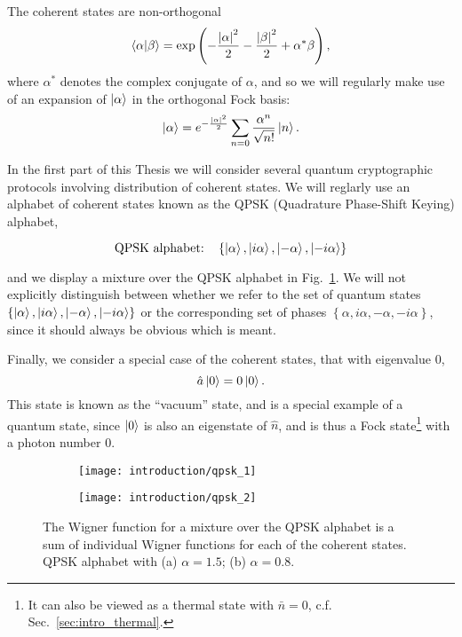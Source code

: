 \noindent The coherent states are non-orthogonal
\begin{equation}
\ip{\alpha}{\beta} = \exp\left(- \frac{\left|\alpha\right|^2}{2} - \frac{\left|\beta\right|^2}{2} + \alpha^* \beta \right),
\end{equation}
where $\alpha^*$ denotes the complex conjugate of $\alpha$, and so we will regularly make use of an expansion of $\ket{\alpha}$ in the orthogonal Fock basis:
\begin{equation}\label{eqn:intro_coherent_fock}
\ket{\alpha} = e^{-\frac{\left|\alpha\right|^2}{2}} \sum_{n=0} \frac{\alpha^n}{\sqrt{n!}} \ket{n}.
\end{equation}

\noindent In the first part of this Thesis we will consider several quantum cryptographic protocols involving distribution of coherent states. We will reglarly use an alphabet of coherent states known as the QPSK (Quadrature Phase-Shift Keying) alphabet, 

\begin{equation}
\qq*{QPSK alphabet:} \left\{\ket{\alpha}, \ket{i \alpha}, \ket{- \alpha}, \ket{- i \alpha}\right\}
\end{equation}

\noindent and we display a mixture over the QPSK alphabet in Fig.~\ref{fig:qpsk}. We will not explicitly distinguish between whether we refer to the set of quantum states $\left\{\ket{\alpha}, \ket{i \alpha}, \ket{- \alpha}, \ket{- i \alpha}\right\}$ or the corresponding set of phases $\left\{ \alpha, i \alpha, -\alpha, - i\alpha\right\}$, since it should always be obvious which is meant.

Finally, we consider a special case of the coherent states, that with eigenvalue $0$,
\begin{equation}
\hat{a} \ket{0} = 0 \ket{0}.
\end{equation}
\noindent This state is known as the ``vacuum'' state, and is a special example of a quantum state, since $\ket{0}$ is also an eigenstate of $\hat{n}$, and is thus a Fock state\footnote{It can also be viewed as a thermal state with $\bar{n}=0$, c.f. Sec.~\ref{sec:intro_thermal}.} with a photon number $0$.


\begin{figure}[htp]
\captionsetup{width=0.8\linewidth}
\centering
\begin{subfigure}[b]{0.49\linewidth}
\texttt{[image: introduction/qpsk\_1]}
\caption{}
\end{subfigure}
\begin{subfigure}[b]{0.49\linewidth}
\texttt{[image: introduction/qpsk\_2]}
\caption{}
\end{subfigure}
\caption{\label{fig:qpsk} The Wigner function for a mixture over the QPSK alphabet is a sum of individual Wigner functions for each of the coherent states. QPSK alphabet with (a) $\alpha=1.5$; (b) $\alpha=0.8$.}
\end{figure}

